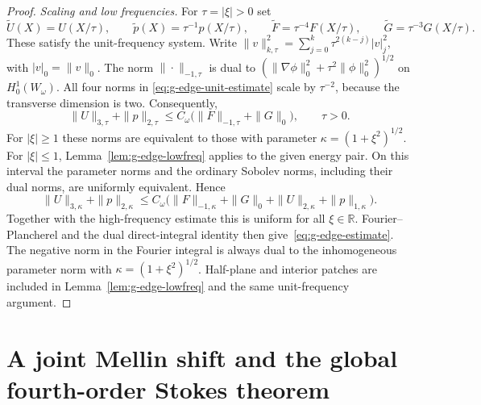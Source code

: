 \documentclass[11pt,a4paper]{article}
\theoremstyle{remark}
\numberwithin{equation}{section}
\begin{document}
\begin{proof}
\emph{Scaling and low frequencies.}
For $\tau=|\xi|>0$ set
\begin{equation}\label{eq:g-edge-fourier-rescaling}
 \widetilde U(X)=U(X/\tau),\qquad
 \widetilde p(X)=\tau^{-1}p(X/\tau),\qquad
 \widetilde F=\tau^{-4}F(X/\tau),\qquad
 \widetilde G=\tau^{-3}G(X/\tau).
\end{equation}
These satisfy the unit-frequency system. Write
$\|v\|_{k,\tau}^2=\sum_{j=0}^k\tau^{2(k-j)}|v|_j^2$, with
$|v|_0=\|v\|_0$. The norm $\|\cdot\|_{-1,\tau}$ is dual to
$(\|\nabla\phi\|_0^2+\tau^2\|\phi\|_0^2)^{1/2}$ on
$H^1_0(W_\omega)$. All four norms in
\eqref{eq:g-edge-unit-estimate} scale by $\tau^{-2}$, because the
transverse dimension is two. Consequently,
\begin{equation}\label{eq:g-edge-scaled-estimate}
 \|U\|_{3,\tau}+\|p\|_{2,\tau}
 \le C_\omega\bigl(\|F\|_{-1,\tau}+\|G\|_0\bigr),\qquad\tau>0.
\end{equation}
For $|\xi|\ge1$ these norms are equivalent to those with parameter
$\kappa=(1+\xi^2)^{1/2}$. For $|\xi|\le1$, Lemma~\ref{lem:g-edge-lowfreq} applies to the given energy
pair. On this interval the parameter norms and the ordinary Sobolev norms,
including their dual norms, are uniformly equivalent. Hence
\[
 \|U\|_{3,\kappa}+\|p\|_{2,\kappa}
 \le C_\omega\bigl(\|F\|_{-1,\kappa}+\|G\|_0+
                 \|U\|_{2,\kappa}+\|p\|_{1,\kappa}\bigr).
\]
Together with the high-frequency estimate this is uniform for all
$\xi\in\mathbb R$. Fourier--Plancherel and the dual direct-integral identity
then give~\eqref{eq:g-edge-estimate}. The negative norm in the Fourier
integral is always dual to the inhomogeneous parameter norm with
$\kappa=(1+\xi^2)^{1/2}$. Half-plane and interior patches are included in
Lemma~\ref{lem:g-edge-lowfreq} and the same unit-frequency argument.
\end{proof}

\section{A joint Mellin shift and the global fourth-order Stokes theorem}
\label{sec:g-global}
\end{document}
